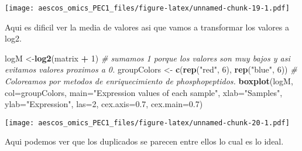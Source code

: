 \documentclass[
]{article}
\newenvironment{Shaded}{\begin{snugshade}}{\end{snugshade}}
\newcommand{\AttributeTok}[1]{\textcolor[rgb]{0.13,0.29,0.53}{#1}}
\newcommand{\CommentTok}[1]{\textcolor[rgb]{0.56,0.35,0.01}{\textit{#1}}}
\newcommand{\DecValTok}[1]{\textcolor[rgb]{0.00,0.00,0.81}{#1}}
\newcommand{\FloatTok}[1]{\textcolor[rgb]{0.00,0.00,0.81}{#1}}
\newcommand{\FunctionTok}[1]{\textcolor[rgb]{0.13,0.29,0.53}{\textbf{#1}}}
\newcommand{\NormalTok}[1]{#1}
\newcommand{\OtherTok}[1]{\textcolor[rgb]{0.56,0.35,0.01}{#1}}
\newcommand{\SpecialCharTok}[1]{\textcolor[rgb]{0.81,0.36,0.00}{\textbf{#1}}}
\newcommand{\StringTok}[1]{\textcolor[rgb]{0.31,0.60,0.02}{#1}}
\begin{document}
\texttt{[image: aescos\_omics\_PEC1\_files/figure-latex/unnamed-chunk-19-1.pdf]}

Aqui es dificil ver la media de valores asi que vamos a transformar los
valores a log2.

\begin{Shaded}
\begin{Highlighting}[]
\NormalTok{logM }\OtherTok{\textless{}{-}}\FunctionTok{log2}\NormalTok{(matrix }\SpecialCharTok{+} \DecValTok{1}\NormalTok{) }\CommentTok{\# sumamos 1 porque los valores son muy bajos y asi evitamos valores proximos a 0.}
\NormalTok{groupColors }\OtherTok{\textless{}{-}} \FunctionTok{c}\NormalTok{(}\FunctionTok{rep}\NormalTok{(}\StringTok{"red"}\NormalTok{, }\DecValTok{6}\NormalTok{), }\FunctionTok{rep}\NormalTok{(}\StringTok{"blue"}\NormalTok{, }\DecValTok{6}\NormalTok{)) }\CommentTok{\# Coloreamos por metodos de enriquecimiento de phosphopeptidos.}
\FunctionTok{boxplot}\NormalTok{(logM, }\AttributeTok{col=}\NormalTok{groupColors, }\AttributeTok{main=}\StringTok{"Expression values of each sample"}\NormalTok{,}
    \AttributeTok{xlab=}\StringTok{"Samples"}\NormalTok{,}
    \AttributeTok{ylab=}\StringTok{"Expression"}\NormalTok{, }\AttributeTok{las=}\DecValTok{2}\NormalTok{, }\AttributeTok{cex.axis=}\FloatTok{0.7}\NormalTok{, }\AttributeTok{cex.main=}\FloatTok{0.7}\NormalTok{)}
\end{Highlighting}
\end{Shaded}

\texttt{[image: aescos\_omics\_PEC1\_files/figure-latex/unnamed-chunk-20-1.pdf]}

Aqui podemos ver que los duplicados se parecen entre ellos lo cual es lo
ideal.
\end{document}

